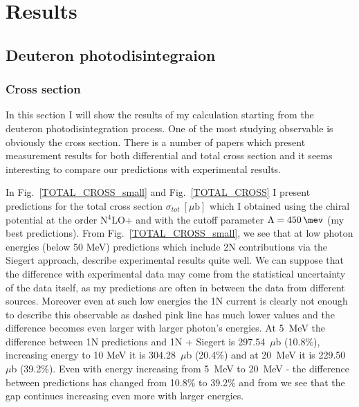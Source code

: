 \chapter{Results}

\section{Deuteron photodisintegraion}

    \subsection{Cross section}
    \label{cross_results}

    In this section I will show the results of my calculation starting from the
    deuteron photodisintegration process. One of the most
    studying observable is obviously the cross section. There is
    a number of papers which present 
    measurement results for both differential and total cross section
    \cite{BOSMAN1979,ARENDS1984,Skopik1974, Moreh1989, Birenbaum1985, Bernabei1986, rachek2007,Ying_Experiment_Deut, DeSanctis_Experiment_Deut} 
    and it seems interesting to compare 
    our predictions with experimental results.

    In Fig.~\ref{TOTAL_CROSS_small} and Fig.~\ref{TOTAL_CROSS} 
    I present predictions for the
    total cross section $\sigma_{tot}~[\mu\text{b}]$ which I obtained
    using the chiral potential at the order N$^4$LO+ and with 
    the cutoff parameter $\Lambda=\SI{450}{\mev}$ (my best predictions).
    From Fig.~\ref{TOTAL_CROSS_small}, we see that at low photon energies
    (below 50 MeV) predictions which include 2N contributions
    via the Siegert approach, describe experimental results quite well.
    We can suppose that the difference with experimental data may come from 
    the statistical uncertainty of  the data itself, as my predictions
    are often in between the data from different sources.
    Moreover even at such low energies the 1N current is clearly not enough
    to describe this observable as dashed pink line has much lower values and
    the difference becomes even larger with larger photon's energies.
    At 5~MeV the difference between 1N predictions
    and 1N + Siegert is 297.54~$\mu$b (10.8\%), increasing energy to 10 MeV
    it is 304.28~$\mu$b (20.4\%) and at 20~MeV it is 229.50~$\mu$b (39.2\%).
    Even with energy increasing from 5~MeV to 20~MeV -
    the difference between predictions has changed from 10.8\% to 39.2\% and
    from  we see that the gap  continues increasing even more with larger energies.

